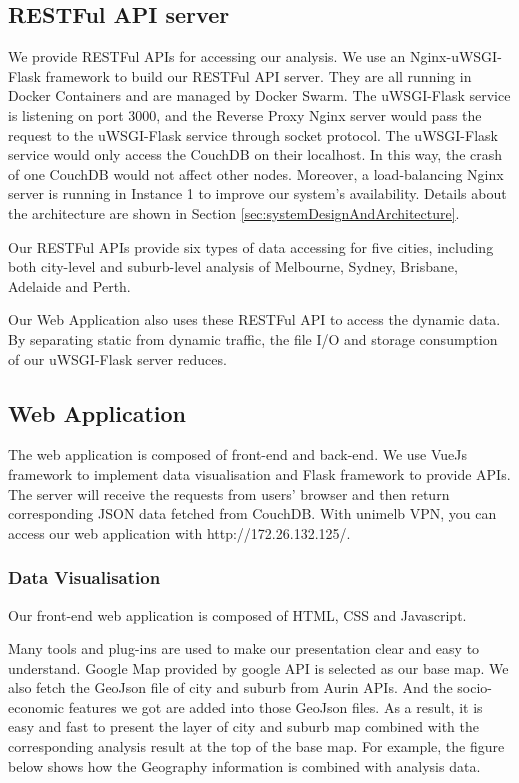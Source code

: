 \documentclass{article}
\begin{document}
\subsection{RESTFul API server}
We provide RESTFul APIs for accessing our analysis. We use an Nginx-uWSGI-Flask framework to build our RESTFul API server. They are all running in Docker Containers and are managed by Docker Swarm. The uWSGI-Flask service is listening on port 3000, and the Reverse Proxy Nginx server would pass the request to the uWSGI-Flask service through socket protocol. The uWSGI-Flask service would only access the CouchDB on their localhost. In this way, the crash of one CouchDB would not affect other nodes. Moreover, a load-balancing Nginx server is running in Instance 1 to improve our system's availability. Details about the architecture are shown in Section \ref{sec:systemDesignAndArchitecture}.

Our RESTFul APIs provide six types of data accessing for five cities, including both city-level and suburb-level analysis of Melbourne, Sydney, Brisbane, Adelaide and Perth. 

Our Web Application also uses these RESTFul API to access the dynamic data. By separating static from dynamic traffic, the file I/O and storage consumption of our uWSGI-Flask server reduces. 

\subsection{Web Application}
The web application is composed of front-end and back-end. We use VueJs framework to implement data visualisation and Flask framework to provide APIs. The server will receive the requests from users’ browser and then return corresponding JSON data fetched from CouchDB. With unimelb VPN, you can access our web application with http://172.26.132.125/.
\subsubsection{Data Visualisation}
Our front-end web application is composed of HTML, CSS and Javascript.

Many tools and plug-ins are used to make our presentation clear and easy to understand. Google Map provided by google API is selected as our base map. We also fetch the GeoJson file of city and suburb from Aurin APIs. And the socio-economic features we got are added into those GeoJson files. As a result, it is easy and fast to present the layer of city and suburb map combined with the corresponding analysis result at the top of the base map. 
For example, the figure below shows how the Geography information is combined with analysis data.
\end{document}
